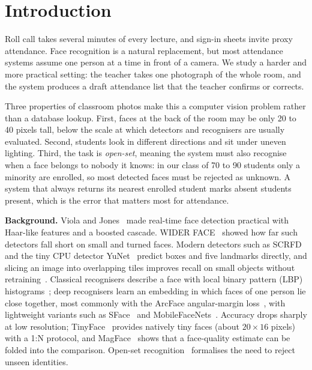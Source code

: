 \documentclass[conference,a4paper]{IEEEtran}
\begin{document}
\section{Introduction}

Roll call takes several minutes of every lecture, and sign-in sheets invite proxy attendance. Face recognition is a natural replacement, but most attendance systems assume one person at a time in front of a camera. We study a harder and more practical setting: the teacher takes one photograph of the whole room, and the system produces a draft attendance list that the teacher confirms or corrects.

Three properties of classroom photos make this a computer vision problem rather than a database lookup. First, faces at the back of the room may be only 20 to 40 pixels tall, below the scale at which detectors and recognisers are usually evaluated. Second, students look in different directions and sit under uneven lighting. Third, the task is \emph{open-set}, meaning the system must also recognise when a face belongs to nobody it knows: in our class of 70 to 90 students only a minority are enrolled, so most detected faces must be rejected as unknown. A system that always returns its nearest enrolled student marks absent students present, which is the error that matters most for attendance.

\textbf{Background.} Viola and Jones~\cite{viola} made real-time face detection practical with Haar-like features and a boosted cascade. WIDER FACE~\cite{wider} showed how far such detectors fall short on small and turned faces. Modern detectors such as SCRFD~\cite{scrfd} and the tiny CPU detector YuNet~\cite{yunet} predict boxes and five landmarks directly, and slicing an image into overlapping tiles improves recall on small objects without retraining~\cite{sahi}. Classical recognisers describe a face with local binary pattern (LBP) histograms~\cite{lbp}; deep recognisers learn an embedding in which faces of one person lie close together, most commonly with the ArcFace angular-margin loss~\cite{arcface}, with lightweight variants such as SFace~\cite{sface} and MobileFaceNets~\cite{mbf}. Accuracy drops sharply at low resolution; TinyFace~\cite{tinyface} provides natively tiny faces (about $20\times16$ pixels) with a 1:N protocol, and MagFace~\cite{magface} shows that a face-quality estimate can be folded into the comparison. Open-set recognition~\cite{scheirer} formalises the need to reject unseen identities.
\end{document}
